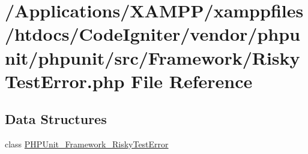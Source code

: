 \hypertarget{_risky_test_error_8php}{}\section{/\+Applications/\+X\+A\+M\+P\+P/xamppfiles/htdocs/\+Code\+Igniter/vendor/phpunit/phpunit/src/\+Framework/\+Risky\+Test\+Error.php File Reference}
\label{_risky_test_error_8php}
\subsection*{Data Structures}
\begin{DoxyCompactItemize}
\item 
class \mbox{\hyperlink{class_p_h_p_unit___framework___risky_test_error}{P\+H\+P\+Unit\+\_\+\+Framework\+\_\+\+Risky\+Test\+Error}}
\end{DoxyCompactItemize}
